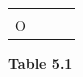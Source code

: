 \begin{enumerate}[noitemsep, label=\textbf{\arabic*}. ]
{{\begin{center}
\begin{tabular}[t]{|l|l|l|l|}
    
         &
    
    
         &
    
    
     \tabularnewline\cline{1-1}\cline{2-2}\cline{3-3}\cline{4-4}
    
    
        \begin{math}\mathrm{O}\end{math} &
    
    
         &
    
    
         &
    
    
     \tabularnewline\cline{1-1}\cline{2-2}\cline{3-3}\cline{4-4}
    \end{tabular}
      \end{center}
    \begin{center}{\small\bfseries Table 5.1}\end{center}
    
}}
\end{enumerate}
